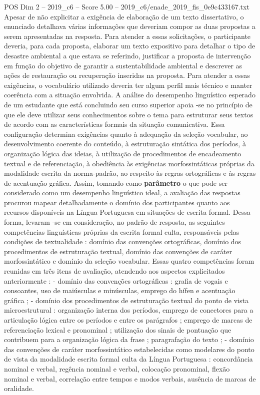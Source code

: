 \begin{textsample}{POS Dim 2 – 2019\_c6 – Score 5.00 – 2019\_c6/enade\_2019\_fis\_0e9c433167.txt}
Apesar de não explicitar a exigência de elaboração de um texto dissertativo, o enunciado detalhava várias informações que deveriam compor as duas propostas a serem apresentadas na resposta.
Para atender a essas solicitações, o participante deveria, para cada proposta, elaborar um texto expositivo para detalhar o tipo de desastre ambiental a que estava se referindo, justificar a proposta de intervenção em função do objetivo de garantir a sustentabilidade ambiental e descrever as ações de restauração ou recuperação inseridas na proposta.
Para atender a essas exigências, o vocabulário utilizado deveria ter algum perfil mais técnico e manter coerência com a situação envolvida.
A análise do desempenho linguístico esperado de um estudante que está concluindo seu curso superior apoia -se no princípio de que ele deve utilizar seus conhecimentos sobre o tema para estruturar seus textos de acordo com as características formais da situação comunicativa.
Essa configuração determina exigências quanto à adequação da seleção vocabular, ao desenvolvimento coerente do conteúdo, à estruturação sintática dos períodos, à organização lógica das ideias, à utilização de procedimentos de encadeamento textual e de referenciação, à obediência às exigências morfossintáticas próprias da modalidade escrita da norma-padrão, ao respeito às regras ortográficas e às regras de acentuação gráfica.
Assim, tomando como \textbf{parâmetro} o que pode ser considerado como um desempenho linguístico ideal, a avaliação das respostas procurou mapear detalhadamente o domínio dos participantes quanto aos recursos disponíveis na Língua Portuguesa em situações de escrita formal.
Dessa forma, levaram -se em consideração, no padrão de resposta, as seguintes competências linguísticas próprias da escrita formal culta, responsáveis pelas condições de textualidade : domínio das convenções ortográficas, domínio dos procedimentos de estruturação textual, domínio das convenções de caráter morfossintático e domínio da seleção vocabular.
Essas quatro competências foram reunidas em três itens de avaliação, atendendo aos aspectos explicitados anteriormente : - domínio das convenções ortográficas : grafia de vogais e consoantes, uso de maiúsculas e minúsculas, emprego do hífen e acentuação gráfica ; - domínio dos procedimentos de estruturação textual do ponto de vista microestrutural : organização interna dos períodos, emprego de conectores para a articulação lógica entre os períodos e entre os parágrafos ; emprego de marcas de referenciação lexical e pronominal ; utilização dos sinais de pontuação que contribuem para a organização lógica da frase ; paragrafação do texto ; - domínio das convenções de caráter morfossintático estabelecidas como modelares do ponto de vista da modalidade escrita formal culta da Língua Portuguesa : concordância nominal e verbal, regência nominal e verbal, colocação pronominal, flexão nominal e verbal, correlação entre tempos e modos verbais, ausência de marcas de oralidade.

\end{textsample}
